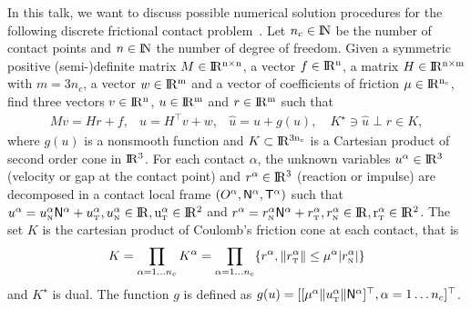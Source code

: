 \documentclass[11pt,a4paper]{article}
\newcommand{\RR}{\ensuremath{\rm I\!R}}
\newcommand{\NN}{\ensuremath{\rm I\!N}}
\def\n{{\hbox{\tiny{N}}}}
\def\t{{\hbox{\tiny{T}}}}
\begin{document}
In this talk, we want to discuss possible numerical solution procedures for the following discrete frictional contact problem~\cite{Acary.Brogliato2008}.   Let $n_c\in \NN$ be the number of contact points and $n\in\NN$ the number of degree of freedom. Given a symmetric positive (semi-)definite matrix ${M} \in \RR^{n \times n}$, a vector $ {f} \in \RR^n$, a matrix  ${H} \in \RR^{n \times m}$ with $m= 3n_c$, a vector $w \in \RR^{m}$ and a vector of coefficients of friction $\mu \in \RR^{n_c}$, find three vectors $ {v} \in \RR^n$, $u\in\RR^m$ and $r\in \RR^m$ such that
\begin{equation}\label{eq:soccp1}
  \begin{array}{rcl}
    M v = {H} {r} + {f}, &
    u = H^\top v + w,  &
    \hat u = u + g(u), \quad 
                         K^\star \ni {\hat u} \perp r \in K,
  \end{array}
\end{equation}
where $g(u)$ is a nonsmooth function and $K\subset \RR^{3 n_c}$ is a Cartesian product of second order cone in $\RR^3$.   For each contact $\alpha$, the unknown variables  $u^\alpha\in\RR^3$ (velocity or gap at the contact point) and $r^\alpha\in\RR^3$ (reaction or impulse) are decomposed  in a contact local frame $(O^\alpha,{\sf N}^\alpha,{\sf T}^\alpha)$ such that $u^\alpha = u^\alpha_{\n} {\sf N}^\alpha +   u^{\alpha}_{\t}, u^\alpha_{\n} \in \RR, u^\alpha_{\t} \in \RR^2$ and  $r^\alpha = r^\alpha_{\n} {\sf N}^\alpha +   r^{\alpha}_{\t}, r^\alpha_{\n} \in \RR, r^\alpha_{\t} \in \RR^2$.
The set $K$ is the cartesian product of Coulomb's friction cone at each contact, that is
\begin{equation}
  \label{eq:CC}
  K = \prod_{\alpha=1\ldots n_c} K^{\alpha}  = \prod_{\alpha=1\ldots n_c} \{r^\alpha, \|r^\alpha_\t \| \leq \mu^\alpha |r^\alpha_\n| \}
\end{equation}
and $K^\star$ is dual.
The function $g$ is defined as $g(u) = [[\mu^\alpha  \|u^\alpha_\t\| {\sf N}^\alpha]^\top, \alpha = 1\ldots n_c]^\top$.
\end{document}

